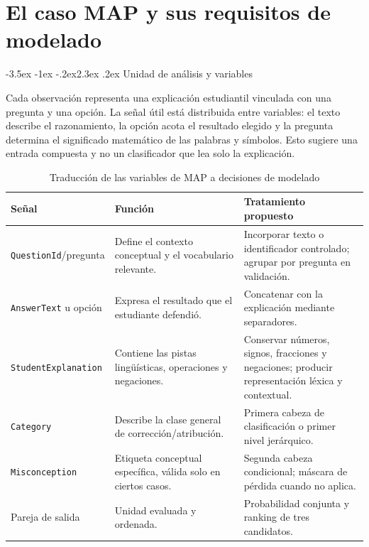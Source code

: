 \documentclass[11pt,oneside,openany]{book}
\makeatletter
\renewcommand\section{\@startsection{section}{1}{\z@}%
  {-3.5ex \@plus -1ex \@minus -.2ex}{2.3ex \@plus .2ex}%
  {\normalfont\Large\sffamily\bfseries\color{AzulMedio}}}
\newcommand{\codigo}[1]{\texttt{#1}}
\makeatother
\begin{document}
\chapter{El caso MAP y sus requisitos de modelado}

\section{Unidad de análisis y variables}

Cada observación representa una explicación estudiantil vinculada con una
pregunta y una opción. La señal útil está distribuida entre variables: el texto
describe el razonamiento, la opción acota el resultado elegido y la pregunta
determina el significado matemático de las palabras y símbolos. Esto sugiere una
entrada compuesta y no un clasificador que lea solo la explicación.

\begin{table}[H]
\centering
\caption{Traducción de las variables de MAP a decisiones de modelado}
\label{tab:variables-modelo}
\begin{tabularx}{\textwidth}{@{}P{3.7cm}YY@{}}
\toprule
\textbf{Señal} & \textbf{Función} & \textbf{Tratamiento propuesto}\\
\midrule
\codigo{QuestionId}/pregunta & Define el contexto conceptual y el vocabulario
relevante. & Incorporar texto o identificador controlado; agrupar por pregunta en
validación.\\
\codigo{AnswerText} u opción & Expresa el resultado que el estudiante defendió. &
Concatenar con la explicación mediante separadores.\\
\codigo{StudentExplanation} & Contiene las pistas lingüísticas, operaciones y
negaciones. & Conservar números, signos, fracciones y negaciones; producir
representación léxica y contextual.\\
\codigo{Category} & Describe la clase general de corrección/atribución. & Primera
cabeza de clasificación o primer nivel jerárquico.\\
\codigo{Misconception} & Etiqueta conceptual específica, válida solo en ciertos
casos. & Segunda cabeza condicional; máscara de pérdida cuando no aplica.\\
Pareja de salida & Unidad evaluada y ordenada. & Probabilidad conjunta y ranking
de tres candidatos.\\
\bottomrule
\end{tabularx}
\end{table}
\end{document}
